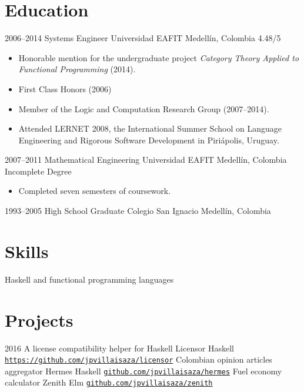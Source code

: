 \documentclass[letterpaper,sans,12pt]{moderncv}
\begin{document}
\section{Education}

\cventry
  {2006--2014}
  {Systems Engineer}
  {Universidad EAFIT}
  {Medellín, Colombia}
  {4.48/5}
  {
    \begin{itemize}
      \item
        Honorable mention for the undergraduate project \emph{Category
        Theory Applied to Functional Programming} (2014).
      \item
        First Class Honors (2006)
      \item
        Member of the Logic and Computation Research Group
        (2007--2014).
      \item
        Attended LERNET 2008, the International Summer School on
        Language Engineering and Rigorous Software Development in
        Piriápolis, Uruguay.
    \end{itemize}
  }
\cventry
  {2007--2011}
  {Mathematical Engineering}
  {Universidad EAFIT}
  {Medellín, Colombia}
  {Incomplete Degree}
  {
    \begin{itemize}
    \item
      Completed seven semesters of coursework.
    \end{itemize}
  }
\cventry
  {1993--2005}
  {High School Graduate}
  {Colegio San Ignacio}
  {Medellín, Colombia}
  {}
  {}

\section{Skills}

  {Haskell and functional programming languages}

\section{Projects}

\cventry
  {2016}
  {A license compatibility helper for Haskell}
  {Licensor}
  {Haskell}
  {}
  {
    \href{https://github.com/jpvillaisaza/licensor}
    {\texttt{https://github.com/jpvillaisaza/licensor}}
  }
\cventry
  {}
  {Colombian opinion articles aggregator}
  {Hermes}
  {Haskell}
  {}
  {
    \href{https://github.com/jpvillaisaza/hermes}
      {\texttt{github.com/jpvillaisaza/hermes}}
  }
\cventry
  {}
  {Fuel economy calculator}
  {Zenith}
  {Elm}
  {}
  {
    \href{https://github.com/jpvillaisaza/zenith}
      {\texttt{github.com/jpvillaisaza/zenith}}
  }
\end{document}
